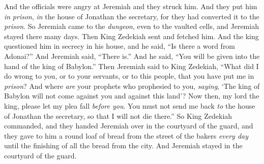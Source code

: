 \begin{biblechapter}
\verse And the officials were angry at Jeremiah and they struck him. And they put him \textit{in} \textit{prison}, \textit{in} the house of Jonathan the secretary, for they had converted it to the \textit{prison}.
\verse So Jeremiah came to the \textit{dungeon}, even to the vaulted cells, and Jeremiah stayed there many days.
\verse Then King Zedekiah sent and fetched him. And the king questioned him in secrecy in his house, and he said, “Is there a word from Adonai?” And Jeremiah said, “There is.” And he said, “You will be given into the hand of the king of Babylon.”
\verse Then Jeremiah said to King Zedekiah, “What did I do wrong to you, or to your servants, or to this people, that you have put me in \textit{prison}?
\verse And where \textit{are} your prophets who prophesied to you, \textit{saying}, ‘The king of Babylon will not come against you and against this land’?
\verse Now then, my lord the king, please let my plea fall \textit{before you}. You must not send me back \textit{to} the house of Jonathan the secretary, so that I will not die there.”
\verse So King Zedekiah commanded, and they handed Jeremiah over in the courtyard of the guard, and they gave to him a round loaf of bread from the street of the bakers \textit{every day} until the finishing of all the bread from the city. And Jeremiah stayed in the courtyard of the guard.
\end{biblechapter}

